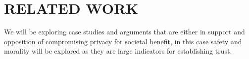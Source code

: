 \documentclass[letterpaper, 10 pt, conference]{ieeeconf}  %
\begin{document}






\section{RELATED WORK}
We will be exploring case studies and arguments that are either in support and opposition of compromising privacy for societal benefit, in this case safety and morality will be explored as they are large indicators for establishing trust. 
\end{document}
